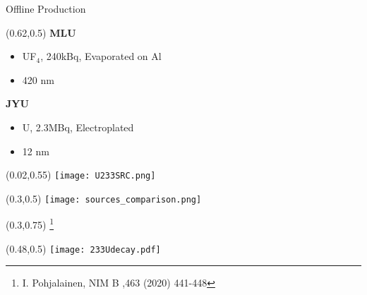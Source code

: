 \documentclass[10pt,aspectratio=169]{beamer}
\begin{document}
\begin{frame}{Offline Production}
{		\begin{textblock*}{0.5\paperwidth}(0.62\paperwidth,0.5\paperheight)
			\textbf{MLU}
			\begin{itemize}
				\item UF$_4$, 240kBq, Evaporated on Al
				\item 420 nm
			\end{itemize}
			\textbf{JYU}
			\begin{itemize}
				\item U, 2.3MBq, Electroplated
				\item 12 nm
			\end{itemize}
		\end{textblock*}
		\begin{textblock*}{0.15\paperwidth}(0.02\paperwidth,0.55\paperheight)
			\texttt{[image: U233SRC.png]}
		\end{textblock*}
		\begin{textblock*}{0.2\paperwidth}(0.3\paperwidth,0.5\paperheight)
			\texttt{[image: sources\_comparison.png]}
		\end{textblock*}
		\begin{textblock*}{0.07\paperwidth}(0.3\paperwidth,0.75\paperheight)
			\footnote{I. Pohjalainen, NIM B ,463 (2020) 441-448}
		\end{textblock*}
		\begin{textblock*}{0.12\paperwidth}(0.48\paperwidth,0.5\paperheight)
			\texttt{[image: 233Udecay.pdf]}
		\end{textblock*}
	}
\end{frame}
\end{document}
